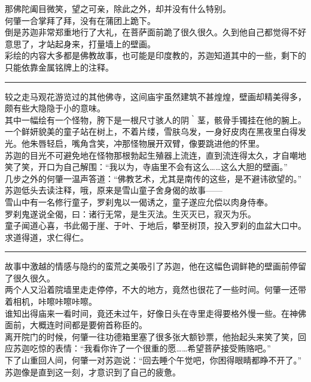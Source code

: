 \documentclass[oneside,11pt]{memoir} %
\begin{document}
\begin{CJK}{UTF8}{gbsn}
    那佛陀阖目微笑，望之可亲，除此之外，却并没有什么特别。\\\indent
    何肇一合掌拜了拜，没有在蒲团上跪下。\\\indent
    倒是苏迦非常郑重地行了大礼，在菩萨面前跪了很久很久。久到他自己都觉得不好意思了，才站起身来，打量墙上的壁画。\\\indent
    彩绘的内容大多都是佛教故事，也可能是印度教的，苏迦知道其中的一些，剩下的只能依靠金属铭牌上的注释。\\\indent
\rule{-3pt}{30pt}
    较之走马观花游览过的其他佛寺，这间庙宇虽然建筑不甚煌煌，壁画却精美得多，颇有些大隐隐于小的意味。\\\indent
    其中一幅绘有一个怪物，胯下是一根尺寸骇人的阴｀茎，骸骨手镯挂在他的腕上。一个鲜妍貌美的童子站在树上，不着片缕，雪肤乌发，一身好皮肉在黑夜里白得发光。他朱唇轻启，嘴角含笑，冲那怪物展开双臂，像要跳进他的怀里。\\\indent
    苏迦的目光不可避免地在怪物那根勃起生殖器上流连，直到流连得太久，才自嘲地笑了笑，开口为自己解围：“我以为，寺庙里不会有这么……这么大胆的壁画。”\\\indent
    几步之外的何肇一温声答道：“佛教艺术，尤其是南传的这些，是不避讳欲望的。”\\\indent
    苏迦低头去读注释，哦，原来是雪山童子舍身偈的故事——\\\indent
    雪山中有一名修行童子，罗刹鬼以一偈诱之，童子遂应允偿以肉身侍奉。\\\indent
    罗刹鬼遂说全偈，曰：诸行无常，是生灭法。生灭灭已，寂灭为乐。\\\indent
    童子闻道心喜，书此偈于崖、于叶、于地后，攀至树顶，投入罗刹的血盆大口中。求道得道，求仁得仁。\\\indent
\rule{-3pt}{30pt}
    故事中激越的情感与隐约的蛮荒之美吸引了苏迦，他在这幅色调鲜艳的壁画前停留了很久很久。\\\indent
    两个人又沿着院墙里走走停停，不大的地方，竟然也很花了一些时间。何肇一还带着相机，咔嚓咔嚓咔嚓。\\\indent
    谁知出得庙来一看时间，竟还未过午，好像日头在寺里走得要格外慢一些。在神佛面前，大概连时间都是要俯首称臣的。\\\indent
    离开院门的时候，何肇一往功德箱里塞了很多张大额钞票，他抬起头来笑了笑，回应苏迦吃惊的表情：“我看你许了一个很重的愿……希望菩萨接受贿赂吧。”\\\indent
    下了山重回人间，何肇一对苏迦说：“回去睡个午觉吧，你困得眼睛都睁不开了。”\\\indent
    苏迦像是直到这一刻，才意识到了自己的疲惫。\\\indent

\end{CJK}
\end{document}
